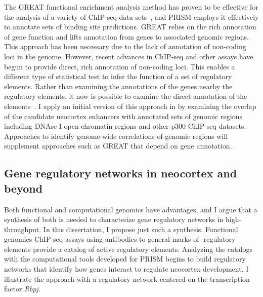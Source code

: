 The GREAT functional enrichment analysis method has proven to be effective for the analysis of a variety of ChIP-seq
data sets~\citep{Lowe2011,RadaIglesias2011,Yoon2011}, and PRISM employs it effectively to annotate sets of binding site predictions.  GREAT relies
on the rich annotation of gene function and lifts annotation from genes to associated genomic regions.  This
approach has been necessary due to the lack of annotation of non-coding loci in the genome.  However,
recent advances in ChIP-seq and other assays have begun to provide direct, rich annotation of non-coding loci.
This enables a different type of statistical test to infer the function of a set of regulatory elements.  Rather
than examining the annotations of the genes nearby the regulatory elements, it now is possible to examine the direct
annotation of the elements~\citep{Chikina2012}.  I apply an initial version of this approach in 
by examining the overlap of the candidate neocortex enhancers with annotated sets of genomic regions including
DNAse I open chromatin regions and other p300 ChIP-seq datasets.  Approaches to identify genome-wide correlations of genomic
regions will supplement approaches such as GREAT that depend on gene annotation.

\subsection{Gene regulatory networks in neocortex and beyond}
Both functional and computational genomics have advantages, and I argue that a synthesis of both is
needed to characterize gene regulatory networks in high-throughput.  In this
dissertation, I propose just such a synthesis.  Functional genomics ChIP-seq assays using antibodies to
general marks of \cis-regulatory elements provide a catalog of active regulatory elements.
Analyzing the catalogs with the computational tools developed for PRISM begins to build regulatory networks
that identify how genes interact to regulate neocortex development.  I illustrate the approach with a regulatory
network centered on the transcription factor \textit{Rbpj}.

